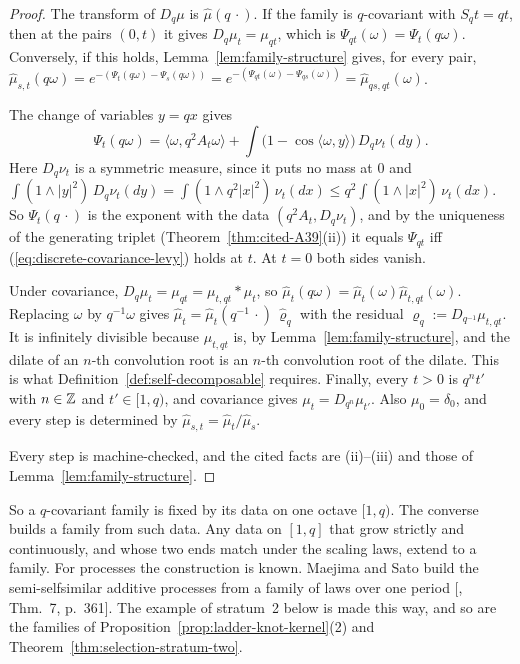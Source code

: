\begin{proof}
The transform of $D_q\mu$ is $\widehat\mu(q\,\cdot)$. If the family is $q$-covariant with
$S_qt = qt$, then at the pairs $(0, t)$ it gives $D_q\mu_t = \mu_{qt}$, which is
$\Psi_{qt}(\omega) = \Psi_t(q\omega)$. Conversely, if this holds, Lemma~\ref{lem:family-structure}
gives, for every pair,
$\widehat\mu_{s,t}(q\omega) = e^{-(\Psi_t(q\omega) - \Psi_s(q\omega))} =
e^{-(\Psi_{qt}(\omega) - \Psi_{qs}(\omega))} = \widehat\mu_{qs,qt}(\omega)$.

The change of variables $y = qx$ gives
\[
  \Psi_t(q\omega) = \langle\omega, q^2A_t\omega\rangle + \int\bigl(1 - \cos\langle\omega, y\rangle\bigr)\,D_q\nu_t(dy).
\]
Here $D_q\nu_t$ is a symmetric \Levy{} measure, since it puts no mass at $0$ and
$\int(1 \wedge |y|^2)\,D_q\nu_t(dy) = \int(1 \wedge q^2|x|^2)\,\nu_t(dx) \le q^2\int(1 \wedge |x|^2)\,\nu_t(dx)$.
So $\Psi_t(q\,\cdot)$ is the exponent with the data $(q^2A_t, D_q\nu_t)$, and by the uniqueness of the
generating triplet (Theorem~\ref{thm:cited-A39}(ii)) it equals $\Psi_{qt}$ iff
(\ref{eq:discrete-covariance-levy}) holds at $t$. At $t = 0$ both sides vanish.

Under covariance, $D_q\mu_t = \mu_{qt} = \mu_{t,qt} * \mu_t$, so
$\widehat\mu_t(q\omega) = \widehat\mu_t(\omega)\widehat\mu_{t,qt}(\omega)$. Replacing $\omega$ by
$q^{-1}\omega$ gives $\widehat\mu_t = \widehat\mu_t(q^{-1}\,\cdot)\,\widehat\varrho_q$ with the residual
$\varrho_q := D_{q^{-1}}\mu_{t,qt}$. It is infinitely divisible because $\mu_{t,qt}$ is, by
Lemma~\ref{lem:family-structure}, and the dilate of an $n$-th convolution root is an $n$-th
convolution root of the dilate. This is what Definition~\ref{def:self-decomposable} requires.
Finally, every $t > 0$ is $q^nt'$ with $n \in \mathbb{Z}$ and $t' \in [1, q)$, and covariance gives
$\mu_t = D_{q^n}\mu_{t'}$. Also $\mu_0 = \delta_0$, and every step is determined by
$\widehat\mu_{s,t} = \widehat\mu_t/\widehat\mu_s$.

Every step is machine-checked, and the cited facts are (ii)--(iii) and those of
Lemma~\ref{lem:family-structure}.
\end{proof}

So a $q$-covariant family is fixed by its data on one octave $[1, q)$. The converse builds a
family from such data. Any data on $[1, q]$ that grow strictly and continuously, and whose two ends
match under the scaling laws, extend to a family. For processes the construction is known. Maejima
and Sato build the semi-selfsimilar additive processes from a family of laws over one period
[, Thm.~7, p.~361]. The example of stratum~2 below is made this way,
and so are the families of Proposition~\ref{prop:ladder-knot-kernel}(2) and
Theorem~\ref{thm:selection-stratum-two}.

